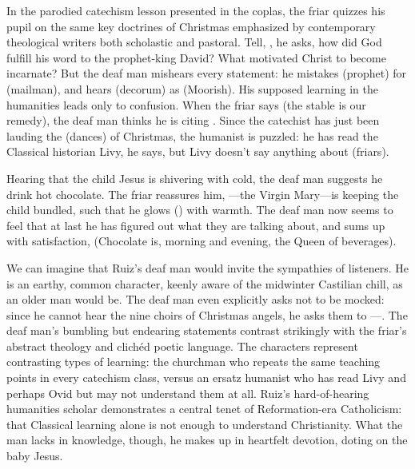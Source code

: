 In the parodied catechism lesson presented in the coplas, the friar quizzes his
pupil on the same key doctrines of Christmas emphasized by contemporary
theological writers both scholastic and pastoral.%
    \Autocite[179--203]{Cashner:PhD}
Tell, , he asks, how did God fulfill his word to the
prophet-king David?  
What motivated Christ to become incarnate? 
But the deaf man mishears every statement: he mistakes 
(prophet) for  (mailman), and hears 
(decorum) as  (Moorish).
His supposed learning in the humanities leads only to confusion.
When the friar says  (the stable is our
remedy), the deaf man thinks he is citing .
Since the catechist has just been lauding the  (dances) of
Christmas, the humanist is puzzled: he has read the Classical historian Livy, he
says, but Livy doesn't say anything about  (friars).

Hearing that the child Jesus is shivering with cold, the deaf man suggests he
drink hot chocolate.
The friar reassures him, ---the Virgin Mary---is keeping the
child bundled, such that he glows () with warmth.
The deaf man now seems to feel that at last he has figured out what they are
talking about, and sums up with satisfaction,  (Chocolate is, morning and evening, the Queen of
beverages).


We can imagine that Ruiz's deaf man would invite the sympathies of listeners.
He is an earthy, common character, keenly aware of the midwinter Castilian
chill, as an older man would be.
The deaf man even explicitly asks not to be mocked: since he cannot hear the
nine choirs of Christmas angels, he asks them to ---.
The deaf man's bumbling but endearing statements contrast strikingly with the
friar's abstract theology and clichéd poetic language.
The characters represent contrasting types of learning: the churchman who
repeats the same teaching points in every catechism class, versus an ersatz
humanist who has read Livy and perhaps Ovid but may not understand them at all.
Ruiz's hard-of-hearing humanities scholar demonstrates a central tenet of
Reformation-era Catholicism: that Classical learning alone is not enough to
understand Christianity.%
    \Autocite[206]{Erasmus:Dolan}
What the man lacks in knowledge, though, he makes up in heartfelt devotion,
doting on the baby Jesus.

